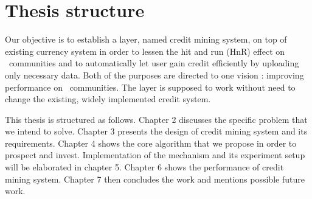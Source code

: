\section{Thesis structure}
Our objective is to establish a layer, named credit mining system, on top of existing currency system in order to lessen the hit and run (HnR) effect on \bt~communities and to automatically let user gain credit efficiently by uploading only necessary data. Both of the purposes are directed to one vision : improving performance on \bt~communities. The layer is supposed to work without need to change the existing, widely implemented credit system.

This thesis is structured as follows. Chapter 2 discusses the specific problem that we intend to solve. Chapter 3 presents the design of credit mining system and its requirements. Chapter 4 shows the core algorithm that we propose in order to prospect and invest. Implementation of the mechanism and its experiment setup will be elaborated in chapter 5. Chapter 6 shows the performance of credit mining system. Chapter 7 then concludes the work and mentions possible future work.


